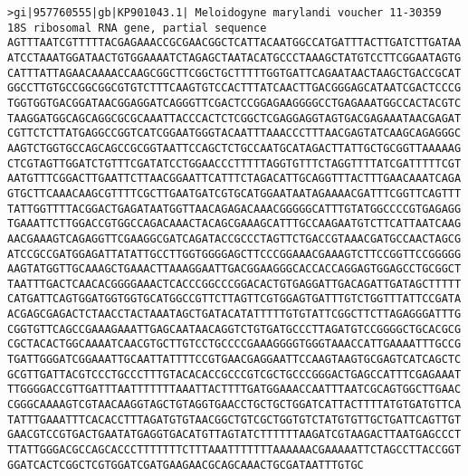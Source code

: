 \documentclass[11pt]{article}
\begin{document}
\begin{Verbatim}[commandchars=\\\{\}]
>gi|957760555|gb|KP901043.1| Meloidogyne marylandi voucher 11-30359 18S ribosomal RNA gene, partial sequence
AGTTTAATCGTTTTTACGAGAAACCGCGAACGGCTCATTACAATGGCCATGATTTACTTGATCTTGATAA
ATCCTAAATGGATAACTGTGGAAAATCTAGAGCTAATACATGCCCTAAAGCTATGTCCTTCGGAATAGTG
CATTTATTAGAACAAAACCAAGCGGCTTCGGCTGCTTTTTGGTGATTCAGAATAACTAAGCTGACCGCAT
GGCCTTGTGCCGGCGGCGTGTCTTTCAAGTGTCCACTTTATCAACTTGACGGGAGCATAATCGACTCCCG
TGGTGGTGACGGATAACGGAGGATCAGGGTTCGACTCCGGAGAAGGGGCCTGAGAAATGGCCACTACGTC
TAAGGATGGCAGCAGGCGCGCAAATTACCCACTCTCGGCTCGAGGAGGTAGTGACGAGAAATAACGAGAT
CGTTCTCTTATGAGGCCGGTCATCGGAATGGGTACAATTTAAACCCTTTAACGAGTATCAAGCAGAGGGC
AAGTCTGGTGCCAGCAGCCGCGGTAATTCCAGCTCTGCCAATGCATAGACTTATTGCTGCGGTTAAAAAG
CTCGTAGTTGGATCTGTTTCGATATCCTGGAACCCTTTTTAGGTGTTTCTAGGTTTTATCGATTTTTCGT
AATGTTTCGGACTTGAATTCTTAACGGAATTCATTTCTAGACATTGCAGGTTTACTTTGAACAAATCAGA
GTGCTTCAAACAAGCGTTTTCGCTTGAATGATCGTGCATGGAATAATAGAAAACGATTTCGGTTCAGTTT
TATTGGTTTTACGGACTGAGATAATGGTTAACAGAGACAAACGGGGGCATTTGTATGGCCCCGTGAGAGG
TGAAATTCTTGGACCGTGGCCAGACAAACTACAGCGAAAGCATTTGCCAAGAATGTCTTCATTAATCAAG
AACGAAAGTCAGAGGTTCGAAGGCGATCAGATACCGCCCTAGTTCTGACCGTAAACGATGCCAACTAGCG
ATCCGCCGATGGAGATTATATTGCCTTGGTGGGGAGCTTCCCGGAAACGAAAGTCTTCCGGTTCCGGGGG
AAGTATGGTTGCAAAGCTGAAACTTAAAGGAATTGACGGAAGGGCACCACCAGGAGTGGAGCCTGCGGCT
TAATTTGACTCAACACGGGGAAACTCACCCGGCCCGGACACTGTGAGGATTGACAGATTGATAGCTTTTT
CATGATTCAGTGGATGGTGGTGCATGGCCGTTCTTAGTTCGTGGAGTGATTTGTCTGGTTTATTCCGATA
ACGAGCGAGACTCTAACCTACTAAATAGCTGATACATATTTTTGTGTATTCGGCTTCTTAGAGGGATTTG
CGGTGTTCAGCCGAAAGAAATTGAGCAATAACAGGTCTGTGATGCCCTTAGATGTCCGGGGCTGCACGCG
CGCTACACTGGCAAAATCAACGTGCTTGTCCTGCCCCGAAAGGGGTGGGTAAACCATTGAAAATTTGCCG
TGATTGGGATCGGAAATTGCAATTATTTTCCGTGAACGAGGAATTCCAAGTAAGTGCGAGTCATCAGCTC
GCGTTGATTACGTCCCTGCCCTTTGTACACACCGCCCGTCGCTGCCCGGGACTGAGCCATTTCGAGAAAT
TTGGGGACCGTTGATTTAATTTTTTTAAATTACTTTTGATGGAAACCAATTTAATCGCAGTGGCTTGAAC
CGGGCAAAAGTCGTAACAAGGTAGCTGTAGGTGAACCTGCTGCTGGATCATTACTTTTATGTGATGTTCA
TATTTGAAATTTCACACCTTTAGATGTGTAACGGCTGTCGCTGGTGTCTATGTGTTGCTGATTCAGTTGT
GAACGTCCGTGACTGAATATGAGGTGACATGTTAGTATCTTTTTTAAGATCGTAAGACTTAATGAGCCCT
TTATTGGGACGCCAGCACCCTTTTTTTCTTTAAATTTTTTTAAAAAACGAAAAATTCTAGCCTTACCGGT
GGATCACTCGGCTCGTGGATCGATGAAGAACGCAGCAAACTGCGATAATTTGTGC


\end{Verbatim}
\end{document}
